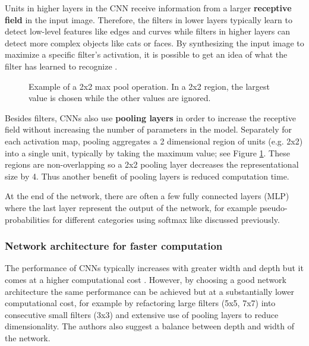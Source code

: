 Units in higher layers in the CNN receive information from a larger \textbf{receptive field} in the input image. Therefore, the filters in lower layers typically learn to detect low-level features like edges and curves while filters in higher layers can detect more complex objects like cats or faces.
By synthesizing the input image to maximize a specific filter's activation, it is possible to get an idea of what the filter has learned to recognize \cite{VisualizeCnn}.

\begin{figure}
\centering
{}

\caption{Example of a 2x2 max pool operation. In a 2x2 region, the largest value is chosen while the other values are ignored.}
\label{fig:maxpool}
\end{figure}

Besides filters, CNNs also use \textbf{pooling layers} in order to increase the receptive field without increasing the number of parameters in the model.
Separately for each activation map, pooling aggregates a 2 dimensional region of units (e.g. 2x2) into a single unit, typically by taking the maximum value; see Figure \ref{fig:maxpool}. These regions are non-overlapping so a 2x2 pooling layer decreases the representational size by 4. Thus another benefit of pooling layers is reduced computation time.

At the end of the network, there are often a few fully connected layers (MLP) where the last layer represent the output of the network, for example pseudo-probabilities for different categories using softmax like discussed previously.

\subsubsection{Network architecture for faster computation}

The performance of CNNs typically increases with greater width and depth but it comes at a higher computational cost \cite{InceptionV3}. However, by choosing a good network architecture the same performance can be achieved but at a substantially lower computational cost, for example by refactoring large filters (5x5, 7x7) into consecutive small filters (3x3) and extensive use of pooling layers to reduce dimensionality. The authors also suggest a balance between depth and width of the network.

